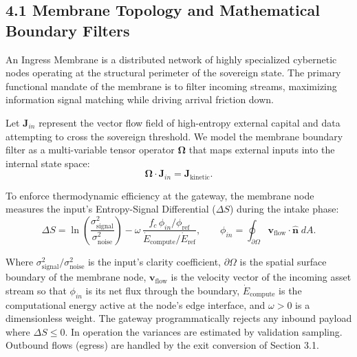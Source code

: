 \documentclass[11pt,a4paper]{article}
\theoremstyle{definition}
\theoremstyle{plain}
\theoremstyle{remark}
\newcommand{\Edot}{\dot E_{\mathrm{compute}}}
\newcommand{\Eref}{\dot E_{\mathrm{ref}}}
\begin{document}
\subsection*{4.1 Membrane Topology and Mathematical Boundary Filters}
An Ingress Membrane is a distributed network of highly specialized cybernetic nodes operating at the structural perimeter of the sovereign state. The primary functional mandate of the membrane is to filter incoming streams, maximizing information signal matching while driving arrival friction down.

Let $\mathbf J_{in}$ represent the vector flow field of high-entropy external capital and data attempting to cross the sovereign threshold. We model the membrane boundary filter as a multi-variable tensor operator $\boldsymbol\Omega$ that maps external inputs into the internal state space:
\begin{equation}
\boldsymbol\Omega \cdot \mathbf J_{in} = \mathbf J_{\mathrm{kinetic}} .
\end{equation}

To enforce thermodynamic efficiency at the gateway, the membrane node measures the input's Entropy-Signal Differential ($\Delta S$) during the intake phase:
\begin{equation}
\Delta S = \ln\!\left( \frac{\sigma_{\mathrm{signal}}^{2}}{\sigma_{\mathrm{noise}}^{2}} \right)
- \omega\, \frac{f_c \,\phi_{in}/\phi_{\mathrm{ref}}}{\Edot/\Eref},
\qquad
\phi_{in} = \oint_{\partial\Omega} \mathbf v_{\mathrm{flow}} \cdot \hat{\mathbf n}\; dA .
\end{equation}

Where $\sigma_{\mathrm{signal}}^{2}/\sigma_{\mathrm{noise}}^{2}$ is the input's clarity coefficient, $\partial\Omega$ is the spatial surface boundary of the membrane node, $\mathbf v_{\mathrm{flow}}$ is the velocity vector of the incoming asset stream so that $\phi_{in}$ is its net flux through the boundary, $\Edot$ is the computational energy active at the node's edge interface, and $\omega > 0$ is a dimensionless weight. The gateway programmatically rejects any inbound payload where $\Delta S \le 0$. In operation the variances are estimated by validation sampling. Outbound flows (egress) are handled by the exit conversion of Section 3.1.
\end{document}
